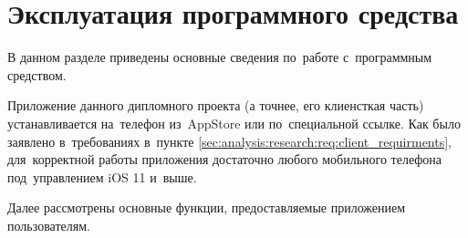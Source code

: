 \section{Эксплуатация программного средства}
\label{sec:usage}

В данном разделе приведены основные сведения по~работе с~программным средством.

Приложение данного дипломного проекта (а точнее, его клиенсткая часть) устанавливается на~телефон из~AppStore или по~специальной ссылке. Как было заявлено в~требованиях в~пункте \ref{sec:analysis:research:req:client_requirments}, для~корректной работы приложения достаточно любого мобильного телефона под~управлением iOS 11 и~выше.

Далее рассмотрены основные функции, предоставляемые приложением пользователям.